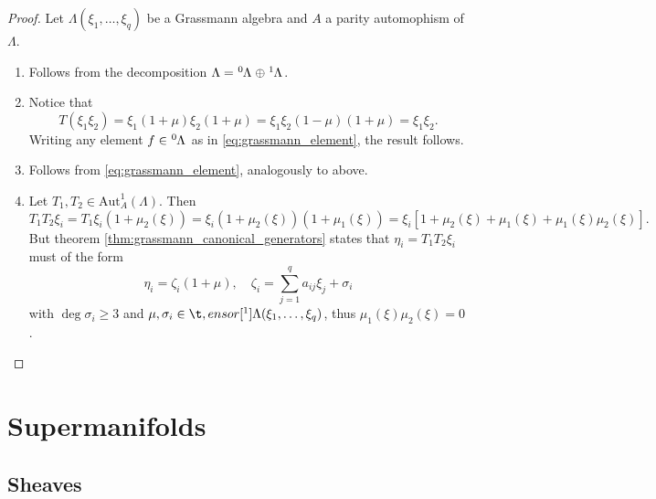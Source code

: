 \documentclass{article}
\theoremstyle{definition}
\begin{document}
\begin{proof}
    Let $\Lambda(\xi_1, \dots, \xi_q)$ be a Grassmann algebra and $A$ a parity automophism of $\Lambda$.
    \begin{enumerate}
        \item Follows from the decomposition $\Lambda = \tensor[^0]{\Lambda}{} \oplus \tensor[^1]{\Lambda}{}$.
        \item Notice that
        \begin{equation*}
            T(\xi_1 \xi_2) = \xi_1(1 + \mu)\xi_2(1 + \mu) = \xi_1 \xi_2 (1 - \mu)(1 + \mu) = \xi_1 \xi_2.
        \end{equation*}
        Writing any element $f \in \tensor[^0]{\Lambda}{}$ as in \eqref{eq:grassmann_element}, the result follows.
        \item Follows from \eqref{eq:grassmann_element}, analogously to above.
        \item Let $T_1, T_2 \in \text{Aut}_A^1(\Lambda)$. Then
        \begin{equation*}
            T_1 T_2 \xi_i = T_1 \xi_i (1 + \mu_2(\xi))
            = \xi_i(1 + \mu_2(\xi))(1 + \mu_1(\xi))
            = \xi_i \left[1 + \mu_2(\xi) + \mu_1(\xi) + \mu_1(\xi) \mu_2(\xi) \right].
        \end{equation*}
        But theorem \ref{thm:grassmann_canonical_generators} states that $\eta_i = T_1 T_2 \xi_i$ must of the form
        \begin{equation*}
            \eta_i = \zeta_i ( 1 + \mu), \quad \zeta_i = \sum_{j = 1}^q a_{ij} \xi_j + \sigma_i
        \end{equation*}
        with $\deg \sigma_i \geq 3$ and $\mu, \sigma_i \in \t,ensor[^1]{\Lambda(\xi_1, \dots, \xi_q)}{}$, thus $\mu_1(\xi) \mu_2(\xi) = 0$.
    \end{enumerate}
\end{proof}







\newpage

\section{Supermanifolds}

\subsection{Sheaves}
\end{document}
